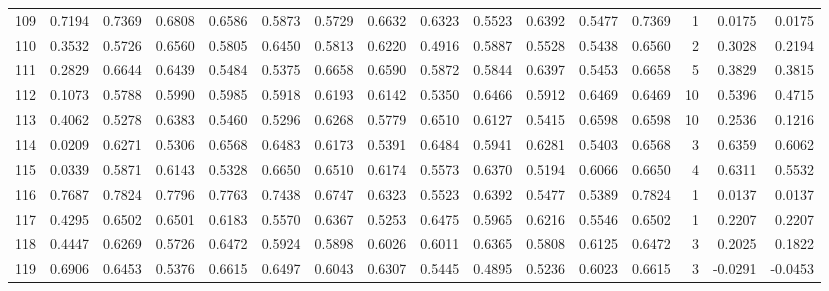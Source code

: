 \begin{tabular}{lrrrrrrrrrrrrrrr}
109 &      0.7194 &  0.7369 &  0.6808 &  0.6586 &  0.5873 &  0.5729 &  0.6632 &  0.6323 &  0.5523 &  0.6392 &   0.5477 &     0.7369 &      1 &                    0.0175 &                     0.0175 \\
110 &      0.3532 &  0.5726 &  0.6560 &  0.5805 &  0.6450 &  0.5813 &  0.6220 &  0.4916 &  0.5887 &  0.5528 &   0.5438 &     0.6560 &      2 &                    0.3028 &                     0.2194 \\
111 &      0.2829 &  0.6644 &  0.6439 &  0.5484 &  0.5375 &  0.6658 &  0.6590 &  0.5872 &  0.5844 &  0.6397 &   0.5453 &     0.6658 &      5 &                    0.3829 &                     0.3815 \\
112 &      0.1073 &  0.5788 &  0.5990 &  0.5985 &  0.5918 &  0.6193 &  0.6142 &  0.5350 &  0.6466 &  0.5912 &   0.6469 &     0.6469 &     10 &                    0.5396 &                     0.4715 \\
113 &      0.4062 &  0.5278 &  0.6383 &  0.5460 &  0.5296 &  0.6268 &  0.5779 &  0.6510 &  0.6127 &  0.5415 &   0.6598 &     0.6598 &     10 &                    0.2536 &                     0.1216 \\
114 &      0.0209 &  0.6271 &  0.5306 &  0.6568 &  0.6483 &  0.6173 &  0.5391 &  0.6484 &  0.5941 &  0.6281 &   0.5403 &     0.6568 &      3 &                    0.6359 &                     0.6062 \\
115 &      0.0339 &  0.5871 &  0.6143 &  0.5328 &  0.6650 &  0.6510 &  0.6174 &  0.5573 &  0.6370 &  0.5194 &   0.6066 &     0.6650 &      4 &                    0.6311 &                     0.5532 \\
116 &      0.7687 &  0.7824 &  0.7796 &  0.7763 &  0.7438 &  0.6747 &  0.6323 &  0.5523 &  0.6392 &  0.5477 &   0.5389 &     0.7824 &      1 &                    0.0137 &                     0.0137 \\
117 &      0.4295 &  0.6502 &  0.6501 &  0.6183 &  0.5570 &  0.6367 &  0.5253 &  0.6475 &  0.5965 &  0.6216 &   0.5546 &     0.6502 &      1 &                    0.2207 &                     0.2207 \\
118 &      0.4447 &  0.6269 &  0.5726 &  0.6472 &  0.5924 &  0.5898 &  0.6026 &  0.6011 &  0.6365 &  0.5808 &   0.6125 &     0.6472 &      3 &                    0.2025 &                     0.1822 \\
119 &      0.6906 &  0.6453 &  0.5376 &  0.6615 &  0.6497 &  0.6043 &  0.6307 &  0.5445 &  0.4895 &  0.5236 &   0.6023 &     0.6615 &      3 &                   -0.0291 &                    -0.0453 \\

\end{tabular}

